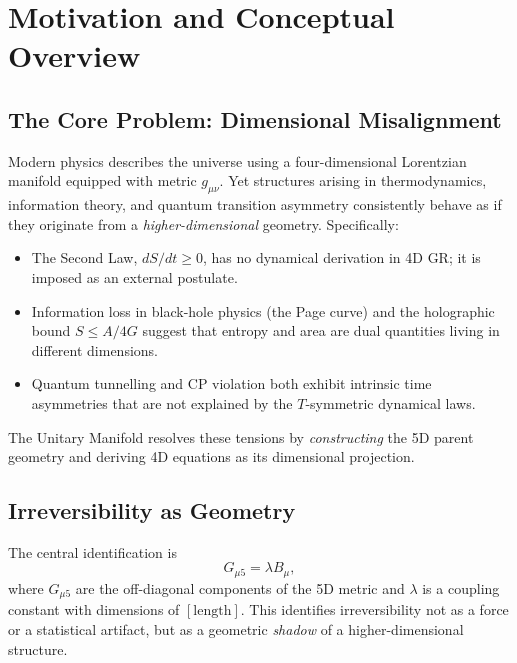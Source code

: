 \documentclass[12pt,a4paper]{article}
\newcommand{\gm}{g_{\mu\nu}}       %
\newcommand{\lam}{\lambda}         %
\begin{document}
\section{Motivation and Conceptual Overview}
\label{sec:motivation}

\subsection{The Core Problem: Dimensional Misalignment}

Modern physics describes the universe using a four-dimensional Lorentzian
manifold equipped with metric $\gm$.  Yet structures arising in thermodynamics,
information theory, and quantum transition asymmetry consistently behave as if
they originate from a \emph{higher-dimensional} geometry.  Specifically:
\begin{itemize}
  \item The Second Law, $dS/dt\ge 0$, has no dynamical derivation in 4D GR; it
        is imposed as an external postulate.
  \item Information loss in black-hole physics (the Page curve) and the
        holographic bound $S\le A/4G$ suggest that entropy and area are
        dual quantities living in different dimensions.
  \item Quantum tunnelling and CP violation both exhibit intrinsic time
        asymmetries that are not explained by the $T$-symmetric dynamical laws.
\end{itemize}

The Unitary Manifold resolves these tensions by \emph{constructing} the 5D
parent geometry and deriving 4D equations as its dimensional projection.

\subsection{Irreversibility as Geometry}
\label{subsec:irreversibility-geometry}

The central identification is
\begin{equation}
  G_{\mu 5} = \lam B_\mu ,
  \label{eq:ident}
\end{equation}
where $G_{\mu 5}$ are the off-diagonal components of the 5D metric and
$\lam$ is a coupling constant with dimensions of $[\text{length}]$.  This
identifies irreversibility not as a force or a statistical artifact, but as a
geometric \emph{shadow} of a higher-dimensional structure.
\end{document}
